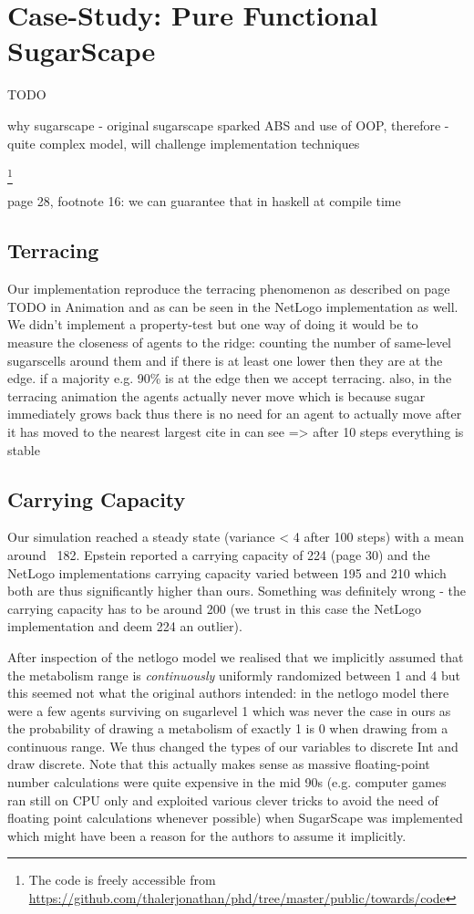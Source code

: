 \section{Case-Study: Pure Functional SugarScape}
TODO

why sugarscape
- original sugarscape sparked ABS and use of OOP, therefore 
- quite complex model, will challenge implementation techniques

\footnote{The code is freely accessible from \url{https://github.com/thalerjonathan/phd/tree/master/public/towards/code}}

\cite{weaver_replicating_nodate}

page 28, footnote 16: we can guarantee that in haskell at compile time

\subsection{Terracing}
Our implementation reproduce the terracing phenomenon as described on page TODO in Animation and as can be seen in the NetLogo implementation as well. We didn't implement a property-test but one way of doing it would be to measure the closeness of agents to the ridge: counting the number of same-level sugarscells around them and if there is at least one lower then they are at the edge. if a majority e.g. 90\% is at the edge then we accept terracing. also, in the terracing animation the agents actually never move which is because sugar immediately grows back thus there is no need for an agent to actually move after it has moved to the nearest largest cite in can see => after 10 steps everything is stable

\subsection{Carrying Capacity}
Our simulation reached a steady state (variance < 4 after 100 steps) with a mean around ~182. Epstein reported a carrying capacity of 224 (page 30) and the NetLogo implementations carrying capacity varied between 195 and 210 which both are thus significantly higher than ours. Something was definitely wrong - the carrying capacity has to be around 200 (we trust in this case the NetLogo implementation and deem 224 an outlier).

After inspection of the netlogo model we realised that we implicitly assumed that the metabolism range is \textit{continuously} uniformly randomized between 1 and 4 but this seemed not what the original authors intended: in the netlogo model there were a few agents surviving on sugarlevel 1 which was never the case in ours as the probability of drawing a metabolism of exactly 1 is 0 when drawing from a continuous range. We thus changed the types of our variables to discrete Int and draw discrete. Note that this actually makes sense as massive floating-point number calculations were quite expensive in the mid 90s (e.g. computer games ran still on CPU only and exploited various  clever tricks to avoid the need of floating point calculations whenever possible) when SugarScape was implemented which might have been a reason for the authors to assume it implicitly.

